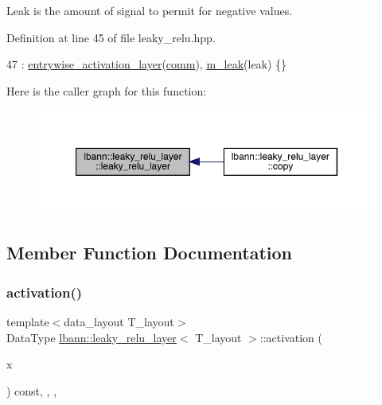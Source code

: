 Leak is the amount of signal to permit for negative values. 

Definition at line 45 of file leaky\+\_\+relu.\+hpp.


\begin{DoxyCode}
47     : \hyperlink{classlbann_1_1entrywise__activation__layer_aada1d9200612dcd13259799ef327c557}{entrywise\_activation\_layer}(\hyperlink{file__io_8cpp_ab048c6f9fcbcfaa57ce68b00263dbebe}{comm}), \hyperlink{classlbann_1_1leaky__relu__layer_afafa6711960f1114b6247fcb5a30c36f}{m\_leak}(leak) \{\}
\end{DoxyCode}
Here is the caller graph for this function\+:\nopagebreak
\begin{figure}[H]
\begin{center}
\leavevmode
\includegraphics[width=350pt]{classlbann_1_1leaky__relu__layer_ae401114a3517c40aabde7fbb9d990a1c_icgraph}
\end{center}
\end{figure}


\subsection{Member Function Documentation}
\mbox{\label{classlbann_1_1leaky__relu__layer_a173d09aa2c6d699634b2ef64a5952ba9}} 
\subsubsection{\texorpdfstring{activation()}{activation()}}
{\footnotesize\ttfamily template$<$data\+\_\+layout T\+\_\+layout$>$ \\
Data\+Type \hyperlink{classlbann_1_1leaky__relu__layer}{lbann\+::leaky\+\_\+relu\+\_\+layer}$<$ T\+\_\+layout $>$\+::activation (\begin{DoxyParamCaption}\item[{Data\+Type}]{x }\end{DoxyParamCaption}) const\hspace{0.3cm}{\ttfamily [inline]}, {\ttfamily [override]}, {\ttfamily [protected]}, {\ttfamily [virtual]}}

